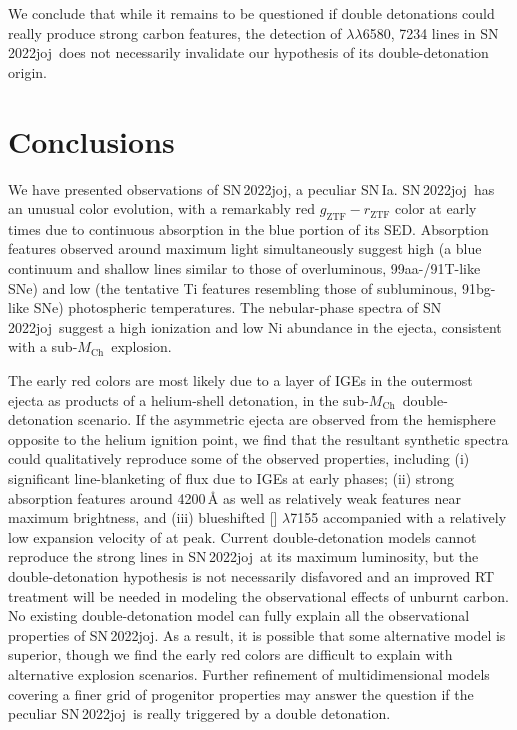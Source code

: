 \documentclass[twocolumn]{aastex631}
\newcommand{\sn}{SN\,2022joj}
\newcommand{\Mch}{$M_\mathrm{Ch}$}
\begin{document}
\begin{CJK*}{UTF8}{gbsn}
We conclude that while it remains to be questioned if double detonations could really produce strong carbon features, the detection of  $\lambda\lambda$6580, 7234 lines in \sn\ does not necessarily invalidate our hypothesis of its double-detonation origin.


\section{Conclusions} \label{sec:conclusion}
We have presented observations of \sn, a peculiar SN\,Ia. \sn\ has an unusual color evolution, with a remarkably red $g_\mathrm{ZTF}-r_\mathrm{ZTF}$ color at early times due to continuous absorption in the blue portion of its SED. Absorption features observed around maximum light simultaneously suggest high (a blue continuum and shallow  lines similar to those of overluminous, 99aa-/91T-like SNe) and low (the tentative Ti features resembling those of subluminous, 91bg-like SNe) photospheric temperatures. The nebular-phase spectra of \sn\ suggest a high ionization and low Ni abundance in the ejecta, consistent with a sub-\Mch\ explosion.

The early red colors are most likely due to a layer of IGEs in the outermost ejecta as products of a helium-shell detonation, in the sub-\Mch\ double-detonation scenario. If the asymmetric ejecta are observed from the hemisphere opposite to the helium ignition point, we find that the resultant synthetic spectra could qualitatively reproduce some of the observed properties, including (i) significant line-blanketing of flux due to IGEs at early phases; (ii) strong absorption features around 4200\,\r{A} as well as relatively weak  features near maximum brightness, and (iii) blueshifted [] $\lambda$7155 accompanied with a relatively low expansion velocity of  at peak. Current double-detonation models cannot reproduce the strong  lines in \sn\ at its maximum luminosity, but the double-detonation hypothesis is not necessarily disfavored and an improved RT treatment will be needed in modeling the observational effects of unburnt carbon.
No existing double-detonation model can fully explain all the observational properties of \sn. As a result, it is possible that some alternative model is superior, though we find the early red colors are difficult to explain with alternative explosion scenarios. Further refinement of multidimensional models covering a finer grid of progenitor properties may answer the question if the peculiar \sn\ is really triggered by a double detonation.\\


\end{CJK*}
\end{document}
